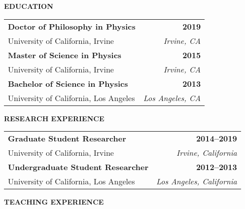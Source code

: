%
\curriculumvitae
{

\textbf{EDUCATION}
  
  \begin{tabular*}{1\textwidth}{@{\extracolsep{\fill}}lr}
    \textbf{Doctor of Philosophy in Physics} & \textbf{2019} \\
    \vspace{6pt}
    University of California, Irvine & \emph{Irvine, CA} \\
    \textbf{Master of Science in Physics} & \textbf{2015} \\
    \vspace{6pt}
    University of California, Irvine & \emph{Irvine, CA} \\
    \textbf{Bachelor of Science in Physics} & \textbf{2013} \\
    \vspace{6pt}
    University of California, Los Angeles & \emph{Los Angeles, CA} \\
  \end{tabular*}

  \vspace{12pt}


\vspace{12pt}
\textbf{RESEARCH EXPERIENCE}

  \begin{tabular*}{1\textwidth}{@{\extracolsep{\fill}}lr}
    \textbf{Graduate Student Researcher} & \textbf{2014--2019} \\
    \vspace{6pt}
    University of California, Irvine & \emph{Irvine, California} \\

    \textbf{Undergraduate Student Researcher} & \textbf{2012--2013} \\
    \vspace{6pt}
    University of California, Los Angeles & \emph{Los Angeles, California} \\
    
  \end{tabular*}

\vspace{12pt}
\textbf{TEACHING EXPERIENCE}

}
